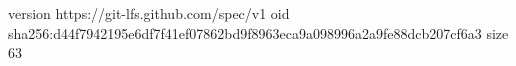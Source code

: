 version https://git-lfs.github.com/spec/v1
oid sha256:d44f7942195e6df7f41ef07862bd9f8963eca9a098996a2a9fe88dcb207cf6a3
size 63
